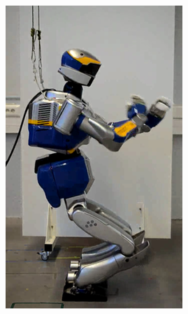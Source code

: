 \begin{figure}
\begin{subfigure}{0.19\columnwidth}
    \includegraphics[width = \columnwidth]
                    {src/chap3-optimal-motion-planning/figure/self-collision-6.png}
    \label{self-collision-6}
  \end{subfigure}
  \begin{subfigure}{0.19\columnwidth}
    \centering

\end{subfigure}
\end{figure}
